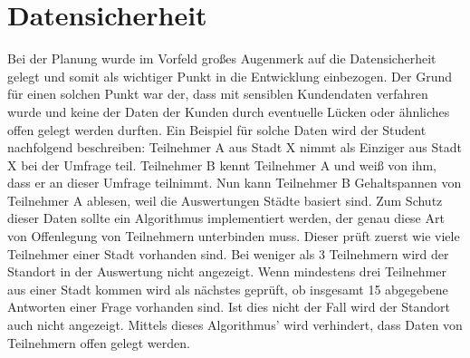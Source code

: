 \section{Datensicherheit}
Bei der Planung wurde im Vorfeld großes Augenmerk auf die Datensicherheit gelegt und somit als wichtiger Punkt in die Entwicklung einbezogen. Der Grund für einen solchen Punkt war der, dass mit sensiblen Kundendaten verfahren wurde und keine der Daten der Kunden durch eventuelle Lücken oder ähnliches offen gelegt werden durften.
Ein Beispiel für solche Daten wird der Student nachfolgend beschreiben: 
Teilnehmer A aus Stadt X nimmt als Einziger aus Stadt X bei der Umfrage teil. Teilnehmer B kennt Teilnehmer A und weiß von ihm, dass er an dieser Umfrage teilnimmt. Nun kann Teilnehmer B Gehaltspannen von Teilnehmer A ablesen, weil die Auswertungen Städte basiert sind. Zum Schutz dieser Daten sollte ein Algorithmus implementiert werden, der genau diese Art von Offenlegung von Teilnehmern unterbinden muss. Dieser prüft zuerst wie viele Teilnehmer einer Stadt vorhanden sind. Bei weniger als 3 Teilnehmern wird der Standort in der Auswertung nicht angezeigt. Wenn mindestens drei Teilnehmer aus einer Stadt kommen wird als nächstes geprüft, ob insgesamt 15 abgegebene Antworten einer Frage vorhanden sind. Ist dies nicht der Fall wird der Standort auch nicht angezeigt. Mittels dieses Algorithmus' wird verhindert, dass Daten von Teilnehmern offen gelegt werden.